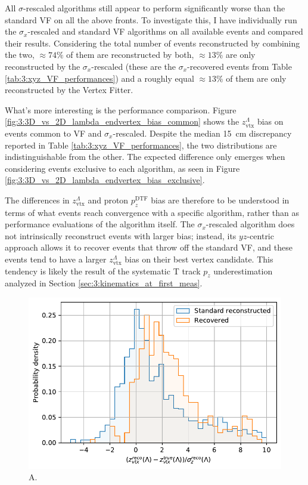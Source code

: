 All $\sigma$-rescaled algorithms still appear to perform significantly worse than the standard VF on all the above fronts.
To investigate this, I have individually run the $\sigma_x$-rescaled and standard VF algorithms on all available events and compared their results.
Considering the total number of events reconstructed by combining the two, $\approx 74\%$ of them are reconstructed by both, $\approx 13\%$ are only reconstructed by the $\sigma_x$-rescaled (these are the $\sigma_x$-recovered events from Table \ref{tab:3:xyz_VF_performances}) and a roughly equal $\approx 13\%$ of them are only reconstructed by the Vertex Fitter.

What's more interesting is the performance comparison. Figure \ref{fig:3:3D_vs_2D_lambda_endvertex_bias_common} shows the $z_\text{vtx}^\Lambda$ bias on events common to VF and $\sigma_x$-rescaled.
Despite the median \SI{15}{\centi\meter} discrepancy reported in Table \ref{tab:3:xyz_VF_performances}, the two distributions are indistinguishable from the other.
The expected difference only emerges when considering events exclusive to each algorithm, as seen in Figure \ref{fig:3:3D_vs_2D_lambda_endvertex_bias_exclusive}.

The differences in $z_\text{vtx}^\Lambda$ and proton $p_z^\text{DTF}$ bias are therefore to be understood in terms of what events reach convergence with a specific algorithm, rather than as performance evaluations of the algorithm itself.
The $\sigma_x$-rescaled algorithm does not intrinsically reconstruct events with larger bias;
instead, its $yz$-centric approach allows it to recover events that throw off the standard VF, and these events tend to have a larger $z_\text{vtx}^\Lambda$ bias on their best vertex candidate.
This tendency is likely the result of the systematic T track $p_z$ underestimation analyzed in Section \ref{sec:3:kinematics_at_first_meas}.

\begin{figure}[t]
	\centering
	\includegraphics[width=.6\textwidth]{graphics/03-vertex_reconstruction/xyz_L_ENDVERTEX_residual_2Dv3D_z_rel.pdf}
	\caption{A.}
	\label{fig:3:xyz_L_ENDVERTEX_residual_2Dv3D_z_rel}
\end{figure}

